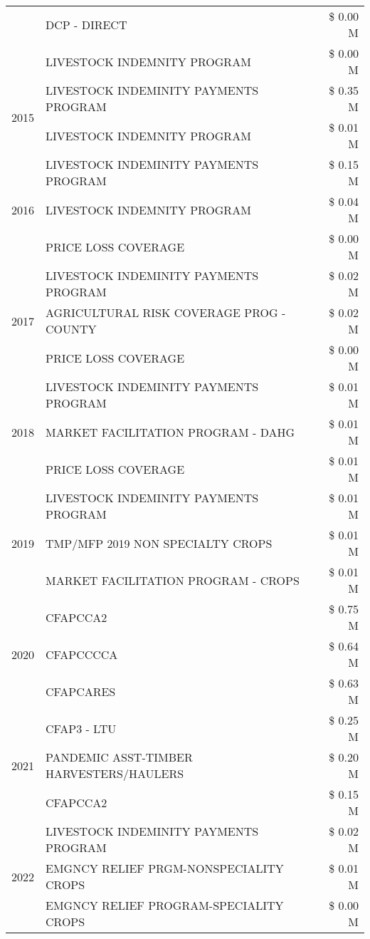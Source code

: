 \begin{tabular}{llr}
 & DCP - DIRECT & \$ 0.00 M \\
 & LIVESTOCK INDEMNITY PROGRAM & \$ 0.00 M \\
\cline{1-3}
\multirow[t]{2}{*}{2015} & LIVESTOCK INDEMINITY PAYMENTS PROGRAM & \$ 0.35 M \\
 & LIVESTOCK INDEMNITY PROGRAM & \$ 0.01 M \\
\cline{1-3}
\multirow[t]{3}{*}{2016} & LIVESTOCK INDEMINITY PAYMENTS PROGRAM & \$ 0.15 M \\
 & LIVESTOCK INDEMNITY PROGRAM & \$ 0.04 M \\
 & PRICE LOSS COVERAGE & \$ 0.00 M \\
\cline{1-3}
\multirow[t]{3}{*}{2017} & LIVESTOCK INDEMINITY PAYMENTS PROGRAM & \$ 0.02 M \\
 & AGRICULTURAL RISK COVERAGE PROG - COUNTY & \$ 0.02 M \\
 & PRICE LOSS COVERAGE & \$ 0.00 M \\
\cline{1-3}
\multirow[t]{3}{*}{2018} & LIVESTOCK INDEMINITY PAYMENTS PROGRAM & \$ 0.01 M \\
 & MARKET FACILITATION PROGRAM - DAHG & \$ 0.01 M \\
 & PRICE LOSS COVERAGE & \$ 0.01 M \\
\cline{1-3}
\multirow[t]{3}{*}{2019} & LIVESTOCK INDEMINITY PAYMENTS PROGRAM & \$ 0.01 M \\
 & TMP/MFP 2019 NON SPECIALTY CROPS & \$ 0.01 M \\
 & MARKET FACILITATION PROGRAM - CROPS & \$ 0.01 M \\
\cline{1-3}
\multirow[t]{3}{*}{2020} & CFAPCCA2 & \$ 0.75 M \\
 & CFAPCCCCA & \$ 0.64 M \\
 & CFAPCARES & \$ 0.63 M \\
\cline{1-3}
\multirow[t]{3}{*}{2021} & CFAP3 - LTU & \$ 0.25 M \\
 & PANDEMIC ASST-TIMBER HARVESTERS/HAULERS & \$ 0.20 M \\
 & CFAPCCA2 & \$ 0.15 M \\
\cline{1-3}
\multirow[t]{3}{*}{2022} & LIVESTOCK INDEMINITY PAYMENTS PROGRAM & \$ 0.02 M \\
 & EMGNCY RELIEF PRGM-NONSPECIALITY CROPS & \$ 0.01 M \\
 & EMGNCY RELIEF PROGRAM-SPECIALITY CROPS & \$ 0.00 M \\
\cline{1-3}
\bottomrule
\end{tabular}
